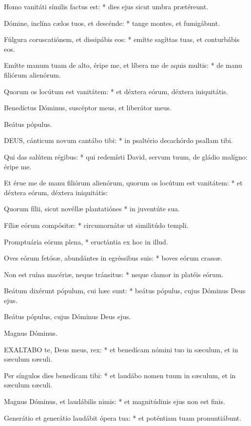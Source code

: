 Homo vanitáti símilis factus est: * dies ejus sicut umbra prætéreunt.

Dómine, inclína cælos tuos, et descénde: * tange montes, et fumigábunt.

Fúlgura coruscatiónem, et dissipábis eos: * emítte sagíttas tuas, et conturbábis eos.

Emítte manum tuam de alto, éripe me, et líbera me de aquis multis: * de manu filiórum alienórum.

Quorum os locútum est vanitátem: * et déxtera eórum, déxtera iniquitátis.

 Benedíctus Dóminus, suscéptor meus, et liberátor meus.

 Beátus pópulus.


\lettrine[lines=2]{D}{EUS}, cánticum novum cantábo tibi: * in psaltério decachórdo psallam tibi.

Qui das salútem régibus: * qui redemísti David, servum tuum, de gládio malígno: éripe me.

Et érue me de manu filiórum alienórum, quorum os locútum est vanitátem: * et déxtera eórum, déxtera iniquitátis:

Quorum fílii, sicut novéllæ plantatiónes * in juventúte sua.

Fíliæ eórum compósitæ: * circumornátæ ut similitúdo templi.

Promptuária eórum plena, * eructántia ex hoc in illud.

Oves eórum fetósæ, abundántes in egréssibus suis: * boves eórum crassæ.

Non est ruína macériæ, neque tránsitus: * neque clamor in platéis eórum.

Beátum dixérunt pópulum, cui hæc sunt: * beátus pópulus, cujus Dóminus Deus ejus.

 Beátus pópulus, cujus Dóminus Deus ejus.

 Magnus Dóminus.


\lettrine[lines=2]{E}{XALTABO} te, Deus meus, rex: * et benedícam nómini tuo in sæculum, et in sæculum sæculi.

Per síngulos dies benedícam tibi: * et laudábo nomen tuum in sæculum, et in sæculum sæculi.

Magnus Dóminus, et laudábilis nimis: * et magnitúdinis ejus non est finis.

Generátio et generátio laudábit ópera tua: * et poténtiam tuam pronuntiábunt.

